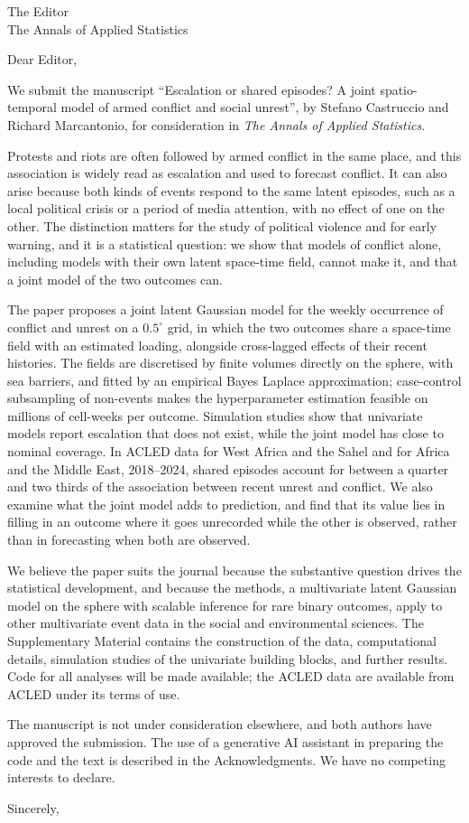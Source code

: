 \documentclass[11pt]{letter}
\begin{document}
\begin{letter}{The Editor\\The Annals of Applied Statistics}
\opening{Dear Editor,}

We submit the manuscript ``Escalation or shared episodes? A joint spatio-temporal model of
armed conflict and social unrest'', by Stefano Castruccio and Richard Marcantonio, for
consideration in \emph{The Annals of Applied Statistics}.

Protests and riots are often followed by armed conflict in the same place, and this
association is widely read as escalation and used to forecast conflict. It can also arise
because both kinds of events respond to the same latent episodes, such as a local political
crisis or a period of media attention, with no effect of one on the other. The distinction
matters for the study of political violence and for early warning, and it is a statistical
question: we show that models of conflict alone, including models with their own latent
space-time field, cannot make it, and that a joint model of the two outcomes can.

The paper proposes a joint latent Gaussian model for the weekly occurrence of conflict and
unrest on a $0.5^\circ$ grid, in which the two outcomes share a space-time field with an
estimated loading, alongside cross-lagged effects of their recent histories. The fields are
discretised by finite volumes directly on the sphere, with sea barriers, and fitted by an
empirical Bayes Laplace approximation; case-control subsampling of non-events makes the
hyperparameter estimation feasible on millions of cell-weeks per outcome. Simulation studies
show that univariate models report escalation that does not exist, while the joint model has
close to nominal coverage. In ACLED data for West Africa and the Sahel and for Africa and the
Middle East, 2018--2024, shared episodes account for between a quarter and two thirds of the
association between recent unrest and conflict. We also examine what the joint model adds to
prediction, and find that its value lies in filling in an outcome where it goes unrecorded
while the other is observed, rather than in forecasting when both are observed.

We believe the paper suits the journal because the substantive question drives the
statistical development, and because the methods, a multivariate latent Gaussian model on
the sphere with scalable inference for rare binary outcomes, apply to other multivariate
event data in the social and environmental sciences. The Supplementary Material contains the
construction of the data, computational details, simulation studies of the univariate
building blocks, and further results. Code for all analyses will be made available; the
ACLED data are available from ACLED under its terms of use.

The manuscript is not under consideration elsewhere, and both authors have approved the
submission. The use of a generative AI assistant in preparing the code and the text is
described in the Acknowledgments. We have no competing interests to declare.

\closing{Sincerely,}
\end{letter}
\end{document}
